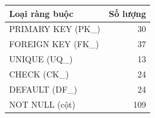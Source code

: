 \begin{tabular}{lr}
\toprule \textbf{Loại ràng buộc} & \textbf{Số lượng} \\ \midrule
PRIMARY KEY (PK\_) & 30 \\
FOREIGN KEY (FK\_) & 37 \\
UNIQUE (UQ\_) & 13 \\
CHECK (CK\_) & 24 \\
DEFAULT (DF\_) & 24 \\
NOT NULL (cột) & 109 \\
\bottomrule
\end{tabular}